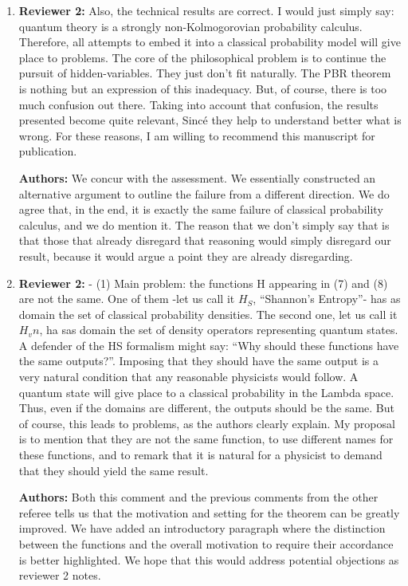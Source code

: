 \documentclass[11pt, executivepaper]{article}
\begin{document}
\begin{enumerate}
	\item \textbf{Reviewer 2:} Also, the technical results are correct. I would just simply say: quantum theory is a strongly non-Kolmogorovian probability calculus. Therefore, all attempts to embed it into a classical probability model will give place to problems. The core of the philosophical problem is to continue the pursuit of hidden-variables. They just don’t fit naturally. The PBR theorem is nothing but an expression of this inadequacy. But, of course, there is too much confusion out there. Taking into account that confusion, the results presented become quite relevant, Sincé they help to understand better what is wrong. For these reasons, I am willing to recommend this manuscript for publication.
	\vspace{2mm}
	
	\textbf{Authors:} We concur with the assessment. We essentially constructed an alternative argument to outline the failure from a different direction. We do agree that, in the end, it is exactly the same failure of classical probability calculus, and we do mention it. The reason that we don't simply say that is that those that already disregard that reasoning would simply disregard our result, because it would argue a point they are already disregarding.
	
	
	\item \textbf{Reviewer 2:} - (1)    Main problem: the functions H appearing in (7) and (8) are not the same. One of them -let us call it $H_S$, “Shannon’s Entropy”- has as domain the set of classical probability densities. The second one, let us call it $H_vn$, ha sas domain the set of density operators representing quantum states. A defender of the HS formalism might say: “Why should these functions have the same outputs?”. Imposing that they should have the same output is a very natural condition that any reasonable physicists would follow. A quantum state will give place to a classical probability in the Lambda space. Thus, even if the domains are different, the outputs should be the same. But of course, this leads to problems, as the authors clearly explain. My proposal is to mention that they are not the same function, to use different names for these functions, and to remark that it is natural for a physicist to demand that they should yield the same result.  
	\vspace{2mm}
	
	\textbf{Authors:} Both this comment and the previous comments from the other referee tells us that the motivation and setting for the theorem can be greatly improved. We have added an introductory paragraph where the distinction between the functions and the overall motivation to require their accordance is better highlighted. We hope that this would address potential objections as reviewer 2 notes.
	

\end{enumerate}
\end{document}
